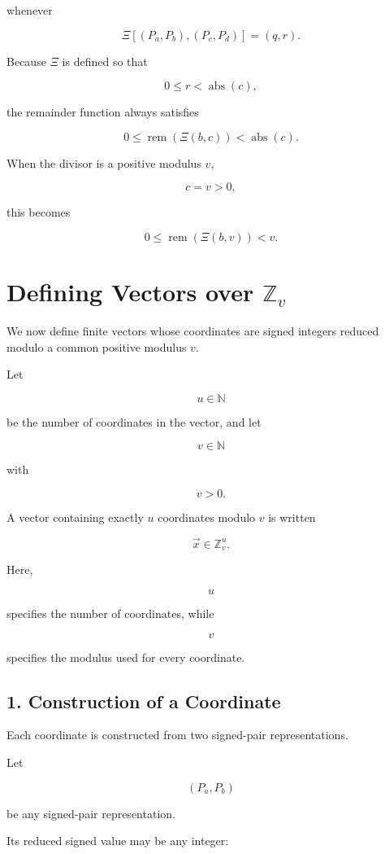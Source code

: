 \documentclass[12pt]{article}
\begin{document}
whenever

\[
\Xi[(P_a,P_b),(P_c,P_d)]
=
(q,r).
\]

Because \(\Xi\) is defined so that

\[
0\leq r<\operatorname{abs}(c),
\]

the remainder function always satisfies

\[
\boxed{
0
\leq
\operatorname{rem}(\Xi(b,c))
<
\operatorname{abs}(c).
}
\]

When the divisor is a positive modulus \(v\),

\[
c=v>0,
\]

this becomes

\[
\boxed{
0
\leq
\operatorname{rem}(\Xi(b,v))
<
v.
}
\]

\section*{Defining Vectors over \(\mathbb Z_v\)}

We now define finite vectors whose coordinates are signed integers reduced modulo a common positive modulus \(v\).

Let

\[
u\in\mathbb N
\]

be the number of coordinates in the vector, and let

\[
v\in\mathbb N
\]

with

\[
v>0.
\]

A vector containing exactly \(u\) coordinates modulo \(v\) is written

\[
\boxed{
\vec{x}\in\mathbb Z_v^u.
}
\]

Here,

\[
u
\]

specifies the number of coordinates, while

\[
v
\]

specifies the modulus used for every coordinate.

\subsection*{1. Construction of a Coordinate}

Each coordinate is constructed from two signed-pair representations.

Let

\[
(P_a,P_b)
\]

be any signed-pair representation.

Its reduced signed value may be any integer:
\end{document}
